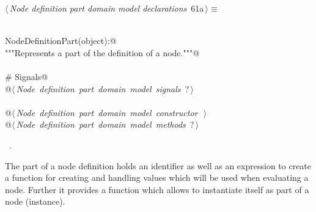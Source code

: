 \documentclass[
    a4paper,      %
    10pt,         %
    openright,    %
    notitlepage,  %
    parskip=half, %
]{scrreprt}       %
\theoremstyle{definition}                    %
\begin{document}
\begin{flushleft} \small
\begin{minipage}{\linewidth}\label{scrap100}\raggedright\small
{} $\langle\,${\itshape Node definition part domain model declarations}\nobreak\ {\footnotesize {61a}}$\,\rangle\equiv$
\vspace{-1exm}
\begin{list}{}{} \item
\mbox{}\lstinline@@\\
\mbox{}\lstinline@class NodeDefinitionPart(object):@\\
\mbox{}\lstinline@    """Represents a part of the definition of a node."""@\\
\mbox{}\lstinline@@\\
\mbox{}\lstinline@    # Signals@\\
\mbox{}\lstinline@    @\hbox{$\langle\,${\itshape Node definition part domain model signals}\nobreak\ {\footnotesize ?}$\,\rangle$}\lstinline@@\\
\mbox{}\lstinline@@\\
\mbox{}\lstinline@    @\hbox{$\langle\,${\itshape Node definition part domain model constructor}\nobreak\ {\footnotesize {}}$\,\rangle$}\lstinline@@\\
\mbox{}\lstinline@    @\hbox{$\langle\,${\itshape Node definition part domain model methods}\nobreak\ {\footnotesize ?}$\,\rangle$}\lstinline@@{\NWsep}
\end{list}
\vspace{-1.5ex}
\footnotesize
\begin{list}{}{\setlength{\itemsep}{-\parsep}\setlength{\itemindent}{-\leftmargin}}
\item \NWtxtMacroRefIn\ .

\item{}
\end{list}
\end{minipage}\vspace{4ex}
\end{flushleft}
The part of a node definition holds an identifier as well as an expression to
create a function for creating and handling values which will be used when
evaluating a node. Further it provides a function which allows to instantiate
itself as part of a node (instance).
\end{document}
